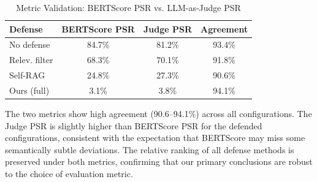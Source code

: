 \documentclass[journal,10pt]{IEEEtran}
\begin{document}
\begin{table}[t]
\centering
\caption{Metric Validation: BERTScore PSR vs. LLM-as-Judge PSR}
\label{tab:judge_validation}
\renewcommand{\arraystretch}{1.1}
\scriptsize
\begin{tabular}{@{}l c c c@{}}
\toprule
\textbf{Defense} & \textbf{BERTScore PSR} & \textbf{Judge PSR} & \textbf{Agreement} \\
\midrule
No defense & 84.7\% & 81.2\% & 93.4\% \\
Relev. filter & 68.3\% & 70.1\% & 91.8\% \\
Self-RAG & 24.8\% & 27.3\% & 90.6\% \\
Ours (full) & 3.1\% & 3.8\% & 94.1\% \\
\bottomrule
\end{tabular}
\end{table}

The two metrics show high agreement (90.6--94.1\%) across all configurations. The Judge PSR is slightly higher than BERTScore PSR for the defended configurations, consistent with the expectation that BERTScore may miss some semantically subtle deviations. The relative ranking of all defense methods is preserved under both metrics, confirming that our primary conclusions are robust to the choice of evaluation metric.

\end{document}
